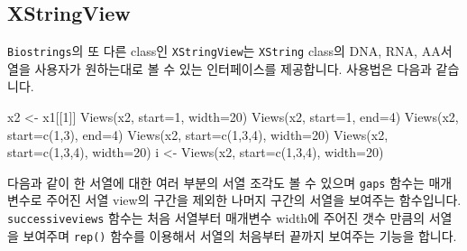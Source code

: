 \documentclass[
]{book}
\newenvironment{Shaded}{\begin{snugshade}}{\end{snugshade}}
\newcommand{\AttributeTok}[1]{\textcolor[rgb]{0.77,0.63,0.00}{#1}}
\newcommand{\DecValTok}[1]{\textcolor[rgb]{0.00,0.00,0.81}{#1}}
\newcommand{\FunctionTok}[1]{\textcolor[rgb]{0.00,0.00,0.00}{#1}}
\newcommand{\NormalTok}[1]{#1}
\newcommand{\OtherTok}[1]{\textcolor[rgb]{0.56,0.35,0.01}{#1}}
\begin{document}
\hypertarget{xstringview}{%
\subsection{XStringView}\label{xstringview}}

\texttt{Biostrings}의 또 다른 class인 \texttt{XStringView}는 \texttt{XString} class의 DNA, RNA, AA서열을 사용자가 원하는대로 볼 수 있는 인터페이스를 제공합니다. 사용법은 다음과 같습니다.

\begin{Shaded}
\begin{Highlighting}[]
\NormalTok{x2 }\OtherTok{\textless{}{-}}\NormalTok{ x1[[}\DecValTok{1}\NormalTok{]]}
\FunctionTok{Views}\NormalTok{(x2, }\AttributeTok{start=}\DecValTok{1}\NormalTok{, }\AttributeTok{width=}\DecValTok{20}\NormalTok{)}
\FunctionTok{Views}\NormalTok{(x2, }\AttributeTok{start=}\DecValTok{1}\NormalTok{, }\AttributeTok{end=}\DecValTok{4}\NormalTok{)}
\FunctionTok{Views}\NormalTok{(x2, }\AttributeTok{start=}\FunctionTok{c}\NormalTok{(}\DecValTok{1}\NormalTok{,}\DecValTok{3}\NormalTok{), }\AttributeTok{end=}\DecValTok{4}\NormalTok{)}
\FunctionTok{Views}\NormalTok{(x2, }\AttributeTok{start=}\FunctionTok{c}\NormalTok{(}\DecValTok{1}\NormalTok{,}\DecValTok{3}\NormalTok{,}\DecValTok{4}\NormalTok{), }\AttributeTok{width=}\DecValTok{20}\NormalTok{)}
\FunctionTok{Views}\NormalTok{(x2, }\AttributeTok{start=}\FunctionTok{c}\NormalTok{(}\DecValTok{1}\NormalTok{,}\DecValTok{3}\NormalTok{,}\DecValTok{4}\NormalTok{), }\AttributeTok{width=}\DecValTok{20}\NormalTok{)}
\NormalTok{i }\OtherTok{\textless{}{-}} \FunctionTok{Views}\NormalTok{(x2, }\AttributeTok{start=}\FunctionTok{c}\NormalTok{(}\DecValTok{1}\NormalTok{,}\DecValTok{3}\NormalTok{,}\DecValTok{4}\NormalTok{), }\AttributeTok{width=}\DecValTok{20}\NormalTok{)}
\end{Highlighting}
\end{Shaded}

다음과 같이 한 서열에 대한 여러 부분의 서열 조각도 볼 수 있으며 \texttt{gaps} 함수는 매개변수로 주어진 서열 view의 구간을 제외한 나머지 구간의 서열을 보여주는 함수입니다. \texttt{successiveviews} 함수는 처음 서열부터 매개변수 width에 주어진 갯수 만큼의 서열을 보여주며 \texttt{rep()} 함수를 이용해서 서열의 처음부터 끝까지 보여주는 기능을 합니다.
\end{document}
